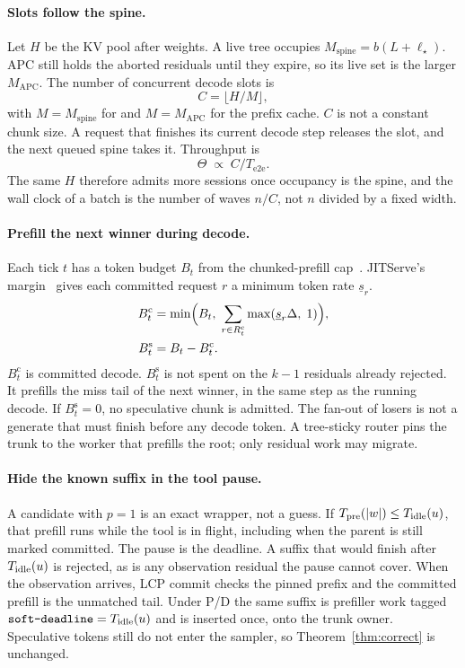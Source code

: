 \paragraph{Slots follow the spine.}
Let $H$ be the KV pool after weights.
A live tree occupies $M_{\mathrm{spine}}=b(L+\ell_\star)$.
APC still holds the aborted residuals until they expire, so its live set is the larger $M_{\mathrm{APC}}$.
The number of concurrent decode slots is
\begin{equation}
\label{eq:slots}
C=\bigl\lfloor H/M\bigr\rfloor,
\end{equation}
with $M=M_{\mathrm{spine}}$ for \sys and $M=M_{\mathrm{APC}}$ for the prefix cache.
$C$ is not a constant chunk size.
A request that finishes its current decode step releases the slot, and the next queued spine takes it.
Throughput is
\begin{equation}
\label{eq:theta}
\Theta\;\propto\; C/T_{\mathrm{e2e}}.
\end{equation}
The same $H$ therefore admits more sessions once occupancy is the spine, and the wall clock of a batch is the number of waves $n/C$, not $n$ divided by a fixed width.

\paragraph{Prefill the next winner during decode.}
Each tick $t$ has a token budget $B_t$ from the chunked-prefill cap~\cite{sarathi}.
JITServe's margin~\cite{jitserve} gives each committed request $r$ a minimum token rate $\underline{s}_r$.
\begin{align}
B^{\mathrm{c}}_t &= \min\Bigl(B_t,\; \sum_{r\in R^{\mathrm{c}}_t}\max(\underline{s}_r\Delta,\;1)\Bigr), \label{eq:bc}\\
B^{\mathrm{s}}_t &= B_t-B^{\mathrm{c}}_t. \label{eq:bs}
\end{align}
$B^{\mathrm{c}}_t$ is committed decode.
$B^{\mathrm{s}}_t$ is not spent on the $k{-}1$ residuals \app already rejected.
It prefills the miss tail of the next winner, in the same step as the running decode.
If $B^{\mathrm{s}}_t=0$, no speculative chunk is admitted.
The fan-out of losers is not a generate that must finish before any decode token.
A tree-sticky router pins the trunk to the worker that prefills the root; only residual work may migrate.

\paragraph{Hide the known suffix in the tool pause.}
A candidate with $p{=}1$ is an exact wrapper, not a guess.
If $T_{\mathrm{pre}}(|w|)\le T_{\mathrm{idle}}(u)$, that prefill runs while the tool is in flight, including when the parent is still marked committed.
The pause is the deadline.
A suffix that would finish after $T_{\mathrm{idle}}(u)$ is rejected, as is any observation residual the pause cannot cover.
When the observation arrives, LCP commit checks the pinned prefix and the committed prefill is the unmatched tail.
Under P/D the same suffix is prefiller work tagged $\texttt{soft-deadline}=T_{\mathrm{idle}}(u)$ and is inserted once, onto the trunk owner.
Speculative tokens still do not enter the sampler, so Theorem~\ref{thm:correct} is unchanged.
